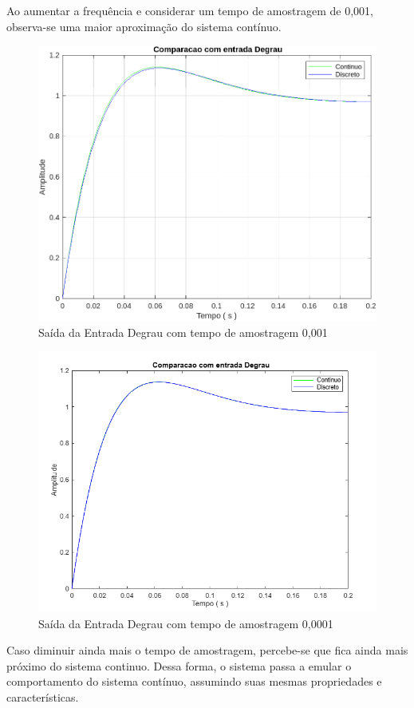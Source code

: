 \documentclass[a4paper, 12pt]{article}
\begin{document}
    Ao aumentar a frequência e considerar um tempo de amostragem de 0,001, observa-se uma maior aproximação do sistema contínuo.
\begin{figure}[H]
    \centering
    \includegraphics[width=0.9\linewidth]{CompraraDegrau2.png}
    \caption{Saída da Entrada Degrau com tempo de amostragem 0,001}
    \label{fig:enter-label}
\end{figure}

\begin{figure}[H]
    \centering
    \includegraphics[width=0.9\linewidth]{wad.png}
    \caption{Saída da Entrada Degrau com tempo de amostragem 0,0001}
    \label{fig:enter-label}
\end{figure}
    Caso diminuir ainda mais o tempo de amostragem, percebe-se que fica ainda mais próximo do sistema continuo. Dessa forma, o sistema passa a emular o comportamento do sistema contínuo, assumindo suas mesmas propriedades e características.
\end{document}
